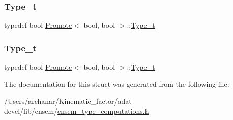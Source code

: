 \subsubsection{\texorpdfstring{Type\_t}{Type\_t}\hspace{0.1cm}{\footnotesize\ttfamily [2/3]}}
{\footnotesize\ttfamily typedef bool \mbox{\hyperlink{structPromote}{Promote}}$<$ bool, bool $>$\+::\mbox{\hyperlink{structPromote_3_01bool_00_01bool_01_4_a102643eea236300318f1131229a59556}{Type\+\_\+t}}}

\mbox{\label{structPromote_3_01bool_00_01bool_01_4_a102643eea236300318f1131229a59556}} 
\subsubsection{\texorpdfstring{Type\_t}{Type\_t}\hspace{0.1cm}{\footnotesize\ttfamily [3/3]}}
{\footnotesize\ttfamily typedef bool \mbox{\hyperlink{structPromote}{Promote}}$<$ bool, bool $>$\+::\mbox{\hyperlink{structPromote_3_01bool_00_01bool_01_4_a102643eea236300318f1131229a59556}{Type\+\_\+t}}}



The documentation for this struct was generated from the following file\+:\begin{DoxyCompactItemize}
\item 
/\+Users/archanar/\+Kinematic\+\_\+factor/adat-\/devel/lib/ensem/\mbox{\hyperlink{adat-devel_2lib_2ensem_2ensem__type__computations_8h}{ensem\+\_\+type\+\_\+computations.\+h}}\end{DoxyCompactItemize}
